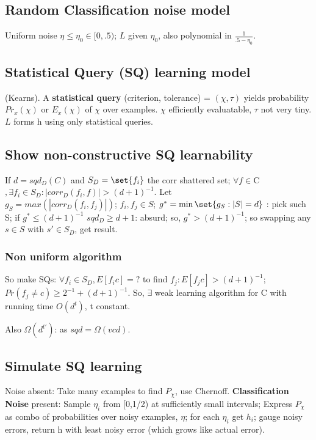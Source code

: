 \documentclass[oneside, article]{memoir}
\begin{document}
\subsection{Random Classification noise model}
Uniform noise $\eta \leq \eta_{0} \in [0,.5)$; $L$ given $\eta_{0}$, also polynomial in $\frac{1}{.5-\eta_{0}}$.

\subsection{Statistical Query (SQ) learning model}
(Kearns). A \textbf{statistical query} (criterion, tolerance) = $(\chi, \tau)$ yields probability $Pr_{x}(\chi)$ or $E_{x}(\chi)$ of $\chi$ over examples. $\chi$ efficiently evaluatable, $\tau$ not very tiny. $L$ forms h using only statistical queries.

\subsection{Show non-constructive SQ learnability}
If $d = sqd_{D}(C)$ and $S_{D} = \set{f_{i}}$ the corr shattered set; $\forall f \in $C$, \exists f_{i} \in S_{D}: |corr_{D}(f_{i},f)| > (d+1)^{-1}$. Let \\
$g_{S} = max(|corr_{D}(f_{i}, f_{j})|)$; 
$f_{i}, f_{j} \in S$; $g^{*} = \min \set{g_{S}: |S| = d}$ : pick such S; if $g^{*} \leq (d+1)^{-1}$ $sqd_{D} \geq d+1$: absurd; so, $g^{*} > (d+1)^{-1}$; so swapping any $s \in S$ with $s' \in S_{D}$, get result.

\subsubsection{Non uniform algorithm}
So make SQs: $\forall f_{i} \in S_{D}, E[f_{i}c] = ?$ to find $f_{j}: E[f_{j}c] > (d+1)^{-1}$; $Pr(f_{j} \neq c) \geq 2^{-1} + (d+1)^{-1}$. So, $\exists$ weak learning algorithm for C with running time $O(d^{t})$, t constant.

Also $\Omega(d^{t'})$: as $sqd = \Omega(vcd)$.

\subsection{Simulate SQ learning}
Noise absent: Take many examples to find $P_{\chi}$, use Chernoff. \textbf{Classification Noise} present: Sample $\eta_{i}$ from [0,1/2) at sufficiently small intervals; Express $P_{\chi}$ as combo of probabilities over noisy examples, $\eta$; for each $\eta_{i}$ get $h_{i}$; gauge noisy errors, return h with least noisy error (which grows like actual error).
\end{document}
